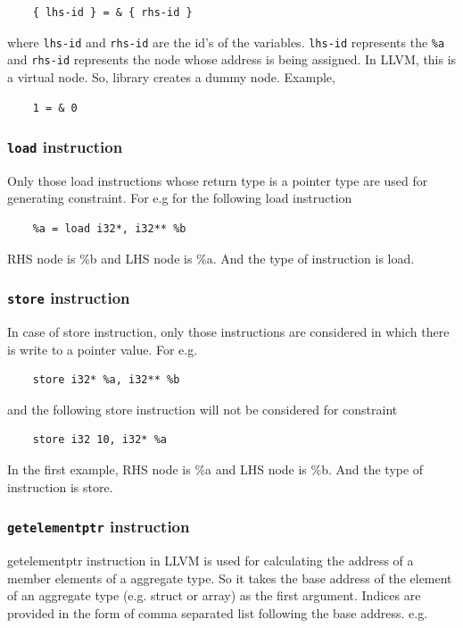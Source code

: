 \documentclass[a4paper,12pt]{report}
\begin{document}
\begin{lstlisting}
    { lhs-id } = & { rhs-id }
\end{lstlisting}
\noindent
where \texttt{lhs-id} and \texttt{rhs-id} are the id's of the variables. 
\texttt{lhs-id} represents the \texttt{\%a} and \texttt{rhs-id} represents the 
node whose address is being assigned. In LLVM, this is a virtual node. So, 
library creates a dummy node.
Example,

\begin{lstlisting}
    1 = & 0
\end{lstlisting}


\subsubsection{\texttt{load} instruction}
Only those load instructions whose return type is a pointer type are used for
generating constraint. For e.g for the following load instruction

\begin{lstlisting}
    %a = load i32*, i32** %b
\end{lstlisting}

\noindent
RHS node is \%b and LHS node is \%a. And the type of instruction is load.

\subsubsection{\texttt{store} instruction}
In case of store instruction, only those instructions are considered in which
there is write to a pointer value. For e.g.

\begin{lstlisting}
    store i32* %a, i32** %b
\end{lstlisting}
\noindent
and the following store instruction will not be considered for constraint

\begin{lstlisting}
    store i32 10, i32* %a
\end{lstlisting}

In the first example, RHS node is \%a and LHS node is \%b. And the type of 
instruction is store.

\subsubsection{\texttt{getelementptr} instruction}
getelementptr instruction in LLVM is used for calculating the address 
of a member elements of a aggregate type. So it takes the base address of
the element of an aggregate type (e.g. struct or array) as the first argument.
Indices are provided in the form of comma separated list following the base 
address.
e.g.
\end{document}
